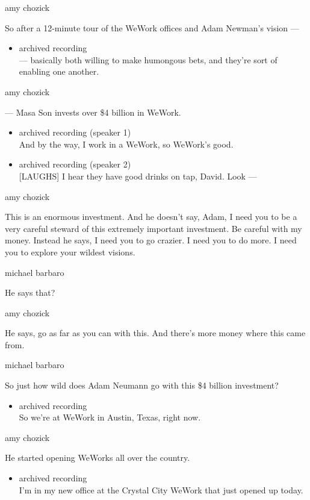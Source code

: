 amy chozick

So after a 12-minute tour of the WeWork offices and Adam Newman's vision
---

\begin{itemize}
\tightlist
\item
  archived recording\\
  --- basically both willing to make humongous bets, and they're sort of
  enabling one another.
\end{itemize}

amy chozick

--- Masa Son invests over \$4 billion in WeWork.

\begin{itemize}
\item
  archived recording (speaker 1)\\
  And by the way, I work in a WeWork, so WeWork's good.
\item
  archived recording (speaker 2)\\
  {[}LAUGHS{]} I hear they have good drinks on tap, David. Look ---
\end{itemize}

amy chozick

This is an enormous investment. And he doesn't say, Adam, I need you to
be a very careful steward of this extremely important investment. Be
careful with my money. Instead he says, I need you to go crazier. I need
you to do more. I need you to explore your wildest visions.

michael barbaro

He says that?

amy chozick

He says, go as far as you can with this. And there's more money where
this came from.

michael barbaro

So just how wild does Adam Neumann go with this \$4 billion investment?

\begin{itemize}
\tightlist
\item
  archived recording\\
  So we're at WeWork in Austin, Texas, right now.
\end{itemize}

amy chozick

He started opening WeWorks all over the country.

\begin{itemize}
\tightlist
\item
  archived recording\\
  I'm in my new office at the Crystal City WeWork that just opened up
  today.
\end{itemize}

